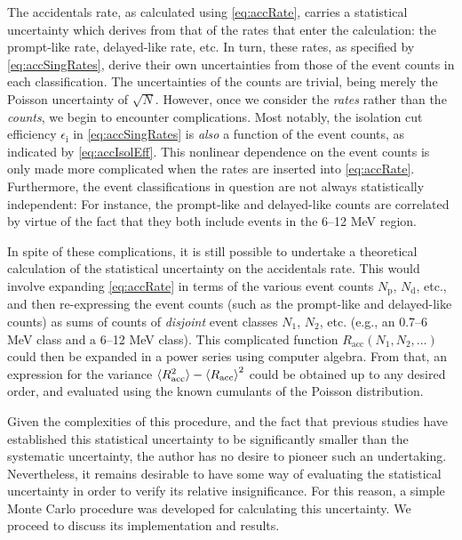 \documentclass[../thesis.tex]{subfiles}
\begin{document}
The accidentals rate, as calculated using \autoref{eq:accRate}, carries a statistical uncertainty which derives from that of the rates that enter the calculation: the prompt-like rate, delayed-like rate, etc. In turn, these rates, as specified by \autoref{eq:accSingRates}, derive their own uncertainties from those of the event counts in each classification. The uncertainties of the counts are trivial, being merely the Poisson uncertainty of $\sqrt{N}$. However, once we consider the \emph{rates} rather than the \emph{counts}, we begin to encounter complications. Most notably, the isolation cut efficiency $\epsilon_{\mathrm{i}}$ in \autoref{eq:accSingRates} is \emph{also} a function of the event counts, as indicated by \autoref{eq:accIsolEff}. This nonlinear dependence on the event counts is only made more complicated when the rates are inserted into \autoref{eq:accRate}. Furthermore, the event classifications in question are not always statistically independent: For instance, the prompt-like and delayed-like counts are correlated by virtue of the fact that they both include events in the 6--12 MeV region.

In spite of these complications, it is still possible to undertake a theoretical calculation of the statistical uncertainty on the accidentals rate. This would involve expanding \autoref{eq:accRate} in terms of the various event counts $N_{\mathrm{p}}$, $N_{\mathrm{d}}$, etc., and then re-expressing the event counts (such as the prompt-like and delayed-like counts) as sums of counts of \emph{disjoint} event classes $N_1$, $N_2$, etc. (e.g., an 0.7--6 MeV class and a 6--12 MeV class). This complicated function $R_{\mathrm{acc}}(N_1, N_2, \ldots)$ could then be expanded in a power series using computer algebra. From that, an expression for the variance $\braket{R_{\mathrm{acc}}^2} - \braket{R_{\mathrm{acc}}}^2$ could be obtained up to any desired order, and evaluated using the known cumulants of the Poisson distribution.

Given the complexities of this procedure, and the fact that previous studies have established this statistical uncertainty to be significantly smaller than the systematic uncertainty, the author has no desire to pioneer such an undertaking. Nevertheless, it remains desirable to have some way of evaluating the statistical uncertainty in order to verify its relative insignificance.
For this reason, a simple Monte Carlo procedure was developed for calculating this uncertainty. We proceed to discuss its implementation and results.
\end{document}
